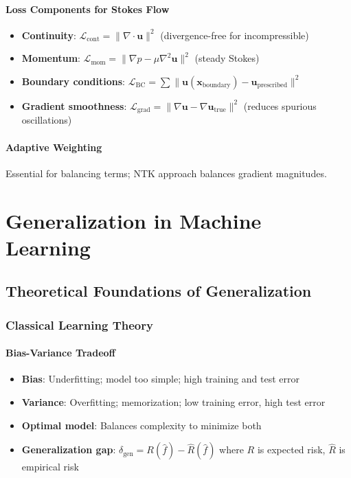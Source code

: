 \subsection{Loss Components for Stokes Flow}
\begin{itemize}
    \item \textbf{Continuity}: $\mathcal{L}_{\text{cont}} = \|\nabla \cdot \mathbf{u}\|^2$ (divergence-free for incompressible)
    \item \textbf{Momentum}: $\mathcal{L}_{\text{mom}} = \|\nabla p - \mu \nabla^2 \mathbf{u}\|^2$ (steady Stokes)
    \item \textbf{Boundary conditions}: $\mathcal{L}_{\text{BC}} = \sum \|\mathbf{u}(\mathbf{x}_{\text{boundary}}) - \mathbf{u}_{\text{prescribed}}\|^2$
    \item \textbf{Gradient smoothness}: $\mathcal{L}_{\text{grad}} = \|\nabla\mathbf{u} - \nabla\mathbf{u}_{\text{true}}\|^2$ (reduces spurious oscillations)
\end{itemize}

\subsection{Adaptive Weighting}
Essential for balancing terms; NTK approach balances gradient magnitudes.

\part{Generalization in Machine Learning}

\chapter{Theoretical Foundations of Generalization}

\section{Classical Learning Theory}

\subsection{Bias-Variance Tradeoff}
\begin{itemize}
    \item \textbf{Bias}: Underfitting; model too simple; high training and test error
    \item \textbf{Variance}: Overfitting; memorization; low training error, high test error
    \item \textbf{Optimal model}: Balances complexity to minimize both
    \item \textbf{Generalization gap}: $\delta_{\text{gen}} = R(\hat{f}) - \hat{R}(\hat{f})$ where $R$ is expected risk, $\hat{R}$ is empirical risk
\end{itemize}

